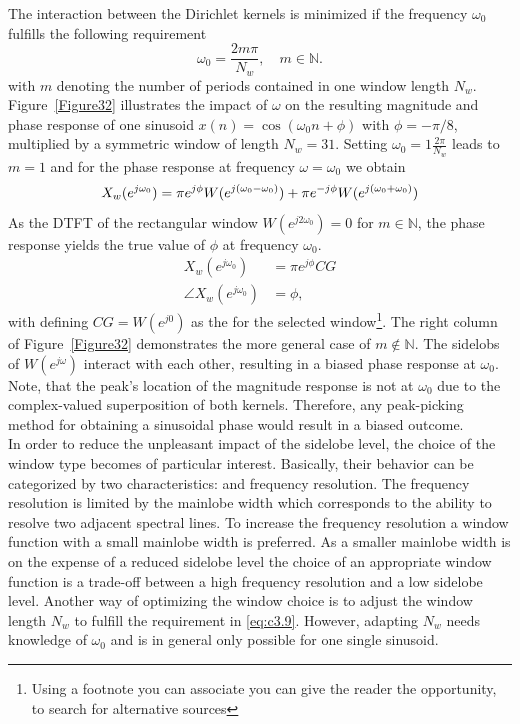 \noindent The interaction between the Dirichlet kernels is minimized if the frequency $\omega_0$ fulfills the following requirement
\begin{equation}\label{eq:c3.9}
\omega_0=\frac{2{m}\pi}{N_w}, \quad m\in\mathbb{N}.
\end{equation}
with $m$ denoting the number of periods contained in one window length $N_w$. Figure~\ref{Figure32} illustrates the impact of $\omega$ on the resulting magnitude and phase response of one sinusoid $x(n)=\cos(\omega_0 n+\phi)$ with $\phi=-\pi/8$, multiplied by a symmetric window of length $N_w=31$. Setting $\omega_0=1\frac{2\pi}{N_w}$ leads to $m=1$ and for the phase response at frequency $\omega=\omega_0$ we obtain
\begin{equation}
X_w(e^{j\omega_0})=\pi e^{j\phi}W(e^{j(\omega_0-\omega_0)})+\pi e^{-j\phi}W(e^{j(\omega_0+\omega_0)})\\
\end{equation}
As the \gls{DTFT} of the rectangular window $W(e^{j2\omega_0})=0$ for $m\in\mathbb{N}$, the phase response yields the true value of $\phi$ at frequency $\omega_0$.
\begin{align}\label{eq:c3.10}
	X_w(e^{j\omega_0})&=\pi e^{j\phi} CG\\
	\angle X_w(e^{j\omega_0})&=\phi,
\end{align}
with defining $CG=W(e^{j0})$ as the  for the selected window\footnote{Using a footnote you can associate you can give the reader the opportunity, to search for alternative sources}. The right column of Figure~\ref{Figure32} demonstrates the more general case of $m\notin\mathbb{N}$. The sidelobs of $W(e^{j\omega})$ interact with each other, resulting in a biased phase response at $\omega_0$. Note, that the peak's location of the magnitude response is not at $\omega_0$ due to the complex-valued superposition of both kernels. Therefore, any peak-picking method for obtaining a sinusoidal phase would result in a biased outcome.\\

\noindent In order to reduce the unpleasant impact of the sidelobe level, the choice of the window type becomes of particular interest. Basically, their behavior can be categorized by two characteristics:  and {frequency resolution}. The frequency resolution is limited by the mainlobe width which corresponds to the ability to resolve two adjacent spectral lines. To increase the frequency resolution a window function with a small mainlobe width is preferred. As a smaller mainlobe width is on the expense of a reduced sidelobe level the choice of an appropriate window function is a trade-off between a high frequency resolution and a low sidelobe level. Another way of optimizing the window choice is to adjust the window length $N_w$ to fulfill the requirement in \eqref{eq:c3.9}. However, adapting $N_w$ needs knowledge of $\omega_0$ and is in general only possible for one single sinusoid. \\

